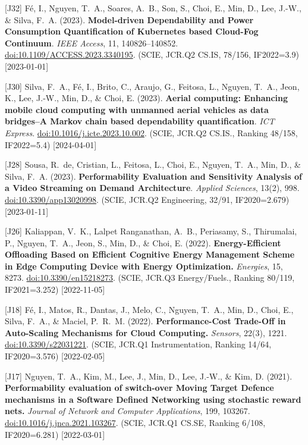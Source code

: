 {\begin{pubenumerate}
\item {\color{blue}[J32]} F\'e, I., Nguyen, T.\ A., Soares, A.\ B., Son, S., Choi, E., Min, D., Lee, J.-W., \& Silva, F.\ A. (2023). \textbf{Model-driven Dependability and Power Consumption Quantification of Kubernetes based Cloud-Fog Continuum}. \textit{IEEE Access}, 11, 140826--140852. \href{https://doi.org/10.1109/ACCESS.2023.3340195}{doi:10.1109/ACCESS.2023.3340195}. (SCIE, JCR.Q2 CS.IS, 78/156, IF2022=3.9) [2023-01-01]

\item {\color{blue}[J30]} Silva, F.\ A., F\'e, I., Brito, C., Araujo, G., Feitosa, L., Nguyen, T.\ A., Jeon, K., Lee, J.-W., Min, D., \& Choi, E. (2023). \textbf{Aerial computing: Enhancing mobile cloud computing with unmanned aerial vehicles as data bridges--A Markov chain based dependability quantification}. \textit{ICT Express}. \href{https://doi.org/10.1016/j.icte.2023.10.002}{doi:10.1016/j.icte.2023.10.002}. (SCIE, JCR.Q2 CS.IS., Ranking 48/158, IF2022=5.4) [2024-04-01]

\item {\color{blue}[J28]} Sousa, R.\ de, Cristian, L., Feitosa, L., Choi, E., Nguyen, T.\ A., Min, D., \& Silva, F.\ A. (2023). \textbf{Performability Evaluation and Sensitivity Analysis of a Video Streaming on Demand Architecture}. \textit{Applied Sciences}, 13(2), 998. \href{https://doi.org/10.3390/app13020998}{doi:10.3390/app13020998}. (SCIE, JCR.Q2 Engineering, 32/91, IF2020=2.679) [2023-01-11]

\item {\color{blue}[J26]} Kaliappan, V.\ K., Lalpet Ranganathan, A.\ B., Periasamy, S., Thirumalai, P., Nguyen, T.\ A., Jeon, S., Min, D., \& Choi, E. (2022). \textbf{Energy-Efficient Offloading Based on Efficient Cognitive Energy Management Scheme in Edge Computing Device with Energy Optimization.} \textit{Energies}, 15, 8273. \href{https://doi.org/10.3390/en15218273}{doi:10.3390/en15218273}. (SCIE, JCR.Q3 Energy/Fuels., Ranking 80/119, IF2021=3.252) [2022-11-05]

\item {\color{blue}[J18]} F\'e, I., Matos, R., Dantas, J., Melo, C., Nguyen, T.\ A., Min, D., Choi, E., Silva, F.\ A., \& Maciel, P.\ R.\ M. (2022). \textbf{Performance-Cost Trade-Off in Auto-Scaling Mechanisms for Cloud Computing.} \textit{Sensors}, 22(3), 1221. \href{https://doi.org/10.3390/s22031221}{doi:10.3390/s22031221}. (SCIE, JCR.Q1 Instrumentation, Ranking 14/64, IF2020=3.576) [2022-02-05]

\item {\color{blue}[J17]} Nguyen, T.\ A., Kim, M., Lee, J., Min, D., Lee, J.-W., \& Kim, D. (2021). \textbf{Performability evaluation of switch-over Moving Target Defence mechanisms in a Software Defined Networking using stochastic reward nets.} \textit{Journal of Network and Computer Applications}, 199, 103267. \href{https://doi.org/10.1016/j.jnca.2021.103267}{doi:10.1016/j.jnca.2021.103267}. (SCIE, JCR.Q1 CS.SE, Ranking 6/108, IF2020=6.281) [2022-03-01]


\end{pubenumerate}}
